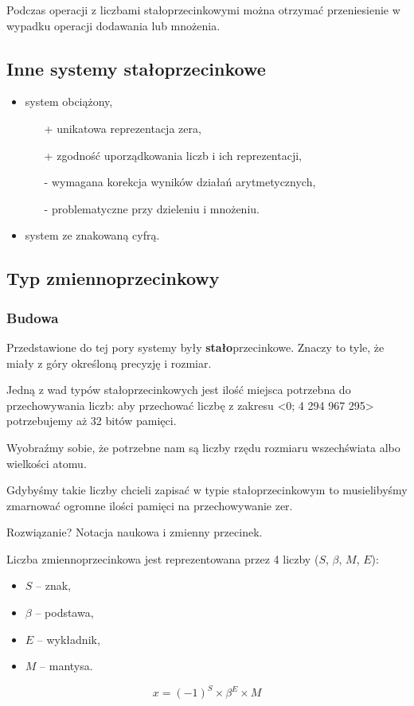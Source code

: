 Podczas operacji z liczbami stałoprzecinkowymi można otrzymać przeniesienie w wypadku operacji dodawania lub mnożenia.

\subsection{Inne systemy stałoprzecinkowe}
\begin{itemize}
\item system obciążony,
\begin{itemize}
\item[+] unikatowa reprezentacja zera,
\item[+] zgodność uporządkowania liczb i ich reprezentacji,
\item[-] wymagana korekcja wyników działań arytmetycznych,
\item[-] problematyczne przy dzieleniu i mnożeniu.
\end{itemize}
\item system ze znakowaną cyfrą.
\end{itemize}

\subsection{Typ zmiennoprzecinkowy}
\subsubsection{Budowa}
Przedstawione do tej pory systemy były \textbf{stało}przecinkowe.
Znaczy to tyle, że miały z góry określoną precyzję i rozmiar.

Jedną z wad typów stałoprzecinkowych jest ilość miejsca potrzebna do przechowywania liczb: aby przechować liczbę z zakresu <0; 4 294 967 295> potrzebujemy aż 32 bitów pamięci.

Wyobraźmy sobie, że potrzebne nam są liczby rzędu rozmiaru wszechświata albo wielkości atomu.

Gdybyśmy takie liczby chcieli zapisać w typie stałoprzecinkowym to musielibyśmy zmarnować ogromne ilości pamięci na przechowywanie zer.

Rozwiązanie? Notacja naukowa i zmienny przecinek.

Liczba zmiennoprzecinkowa jest reprezentowana przez 4 liczby ($S$, $\beta$, $M$, $E$):
\begin{itemize}
\item $S$ -- znak,
\item $\beta$ -- podstawa,
\item $E$ -- wykładnik,
\item $M$ -- mantysa.
\end{itemize}
\begin{equation}
x = (-1)^{S} \times \beta^{E} \times M
\end{equation}

